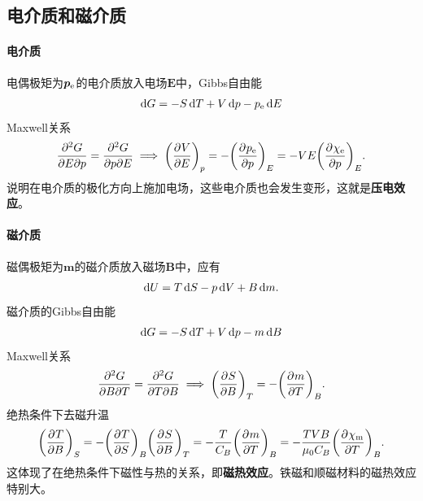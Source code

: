 \subsection{电介质和磁介质}

\paragraph{电介质}

电偶极矩为$\bm p_\elc$的电介质放入电场$\bm E$中，Gibbs自由能
\[
	\d G=-S\d T+V\d p-p_\elc\d E
\]
Maxwell关系
\begin{equation}
	\pw GEp=\pw GpE\implies
	\pu[p]VE=-\pu[E]{p_\elc}p=-VE\pu[E]{\chi_\elc}p.
\end{equation}
说明在电介质的极化方向上施加电场，这些电介质也会发生变形，这就是\textbf{压电效应}。

\paragraph{磁介质}

磁偶极矩为$\bm m$的磁介质放入磁场$\bm B$中，应有
\[
	\d U=T\d S-p\d V+B\d m.
\]
磁介质的Gibbs自由能
\[
	\d G=-S\d T+V\d p-m\d B
\]
Maxwell关系
\[
	\pw GBT=\pw GTB\implies
	\pu[T]SB=-\pu[B]mT.
\]
绝热条件下去磁升温
\[
	\pu[S]TB=-\pu[B]TS\pu[T]SB=-\frac T{C_B}\pu[B]mT=-\frac{TVB}{\mu_0C_B}\pu[B]{\chi_{\mathrm{m}}}T.
\]
这体现了在绝热条件下磁性与热的关系，即\textbf{磁热效应}。铁磁和顺磁材料的磁热效应特别大。

